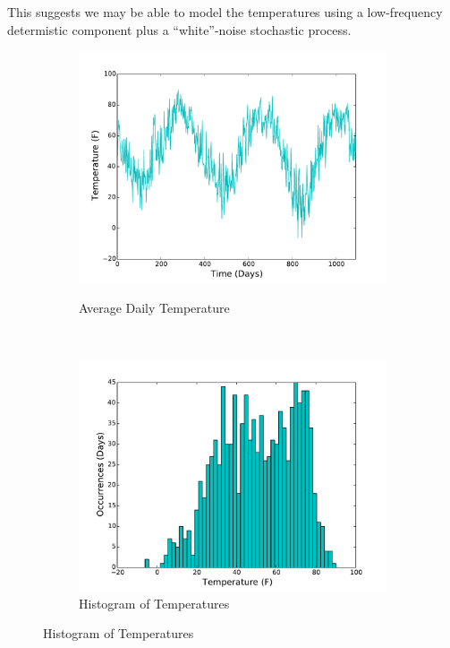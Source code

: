 \documentclass[11pt, letterpaper]{article}
\begin{document}
This suggests we may be able to model the temperatures using a low-frequency determistic component plus a ``white''-noise stochastic process.

\begin{figure}[H]
  \centering
  \begin{subfigure}[b]{0.45\textwidth}
    \includegraphics[width=\textwidth]{figures/average_daily_temp.pdf}
    \label{fig:analysis-raw}
    \caption{Average Daily Temperature}
  \end{subfigure}
  ~
  \begin{subfigure}[b]{0.45\textwidth}
    \includegraphics[width=\textwidth]{figures/average_daily_temp_hist.pdf}
    \caption{Histogram of Temperatures}
  \end{subfigure}

\end{figure}
\end{document}
